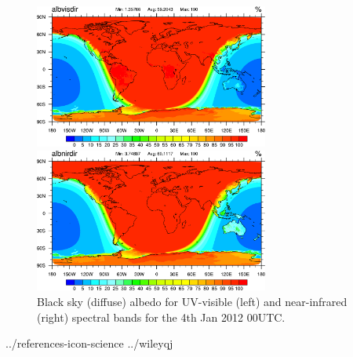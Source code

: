 \documentclass[a4paper,11pt]{article}
\begin{document}
\begin{figure}[ht]
\begin{minipage}[t]{\textwidth}
  \begin{minipage}[t]{0.496\textwidth}
    \center
    \includegraphics[width=7.7cm]{albvisdir_20120104_00UTC.png}
  \end{minipage}
  \begin{minipage}[t]{0.496\textwidth}
    \center
    \includegraphics[width=7.7cm]{albnirdir_20120104_00UTC.png}
  \end{minipage}
\end{minipage}
\caption{Black sky (diffuse) albedo for UV-visible (left) and near-infrared (right) spectral bands for the 4th Jan 2012 00UTC.}\label{fig_albdir}
\end{figure}


 {../references-icon-science}
 {../wileyqj} %
\end{document}
